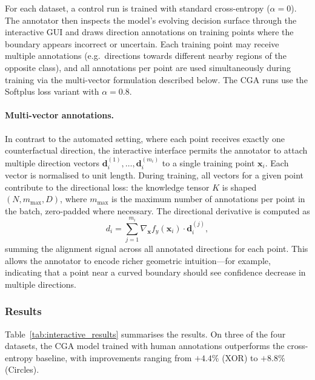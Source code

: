 For each dataset, a control run is trained with standard cross-entropy ($\alpha = 0$). The annotator then inspects the model's evolving decision surface through the interactive GUI and draws direction annotations on training points where the boundary appears incorrect or uncertain. Each training point may receive multiple annotations (e.g.\ directions towards different nearby regions of the opposite class), and all annotations per point are used simultaneously during training via the multi-vector formulation described below. The CGA runs use the Softplus loss variant with $\alpha = 0.8$.

\paragraph{Multi-vector annotations.}
In contrast to the automated setting, where each point receives exactly one counterfactual direction, the interactive interface permits the annotator to attach multiple direction vectors $\mathbf{d}_i^{(1)}, \ldots, \mathbf{d}_i^{(m_i)}$ to a single training point $\mathbf{x}_i$. Each vector is normalised to unit length. During training, all vectors for a given point contribute to the directional loss: the knowledge tensor $K$ is shaped $(N, m_{\max}, D)$, where $m_{\max}$ is the maximum number of annotations per point in the batch, zero-padded where necessary. The directional derivative is computed as
\begin{equation}
d_i = \sum_{j=1}^{m_i} \nabla_{\mathbf{x}} f_y(\mathbf{x}_i) \cdot \mathbf{d}_i^{(j)},
\end{equation}
summing the alignment signal across all annotated directions for each point. This allows the annotator to encode richer geometric intuition---for example, indicating that a point near a curved boundary should see confidence decrease in multiple directions.


\subsubsection{Results}

Table~\ref{tab:interactive_results} summarises the results. On three of the four datasets, the CGA model trained with human annotations outperforms the cross-entropy baseline, with improvements ranging from $+4.4\%$ (XOR) to $+8.8\%$ (Circles).

